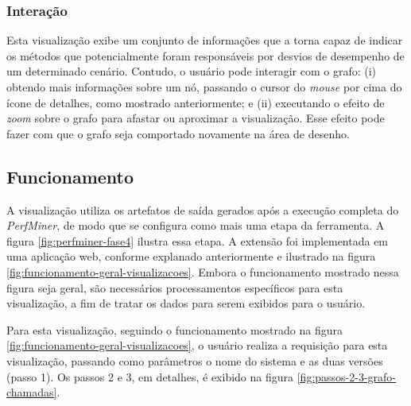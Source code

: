 \subsubsection{Interação} \label{subsec:interacao}

Esta visualização exibe um conjunto de informações que a torna capaz de indicar os métodos que potencialmente foram responsáveis por desvios de desempenho de um determinado cenário. Contudo, o usuário pode interagir com o grafo: (i) obtendo mais informações sobre um nó, passando o cursor do \textit{mouse} por cima do ícone de detalhes, como mostrado anteriormente; e (ii) executando o efeito de \textit{zoom} sobre o grafo para afastar ou aproximar a visualização. Esse efeito pode fazer com que o grafo seja comportado novamente na área de desenho.

\subsection{Funcionamento} \label{subsec:funcionamento-visualizacao-3}

A visualização utiliza os artefatos de saída gerados após a execução completa do \textit{PerfMiner}, de modo que se configura como mais uma etapa da ferramenta. A figura \ref{fig:perfminer-fase4} ilustra essa etapa. A extensão foi implementada em uma aplicação web, conforme explanado anteriormente e ilustrado na figura \ref{fig:funcionamento-geral-visualizacoes}. Embora o funcionamento mostrado nessa figura seja geral, são necessários processamentos específicos para esta visualização, a fim de tratar os dados para serem exibidos para o usuário.

Para esta visualização, seguindo o funcionamento mostrado na figura \ref{fig:funcionamento-geral-visualizacoes}, o usuário realiza a requisição para esta visualização, passando como parâmetros o nome do sistema e as duas versões (passo 1). Os passos 2 e 3, em detalhes, é exibido na figura \ref{fig:passos-2-3-grafo-chamadas}.

